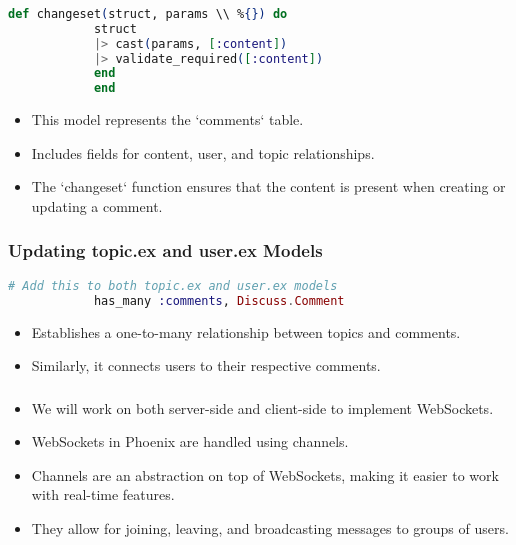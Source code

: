 \documentclass[aspectratio=169, table]{beamer}
\begin{document}
	\begin{frame}[fragile]
		\frametitle{}
		\begin{lstlisting}[language=Elixir]
			def changeset(struct, params \\ %{}) do
			struct
			|> cast(params, [:content])
			|> validate_required([:content])
			end
			end
		\end{lstlisting}
		\begin{itemize}
			\item This model represents the `comments` table.
			\item Includes fields for content, user, and topic relationships.
			\item The `changeset` function ensures that the content is present when creating or updating a comment.
		\end{itemize}
	\end{frame}
	
	\begin{frame}[fragile]
		\frametitle{Updating topic.ex and user.ex Models}
		\begin{lstlisting}[language=Elixir]
			# Add this to both topic.ex and user.ex models
			has_many :comments, Discuss.Comment
		\end{lstlisting}
		\begin{itemize}
			\item Establishes a one-to-many relationship between topics and comments.
			\item Similarly, it connects users to their respective comments.
		\end{itemize}
	\end{frame}
	
	\begin{frame}
		\frametitle{}
		\begin{itemize}
			\item We will work on both server-side and client-side to implement WebSockets.
			\item WebSockets in Phoenix are handled using channels.
			\item Channels are an abstraction on top of WebSockets, making it easier to work with real-time features.
			\item They allow for joining, leaving, and broadcasting messages to groups of users.
		\end{itemize}
	\end{frame}
	
\end{document}
